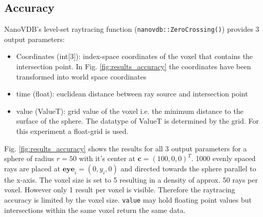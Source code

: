 \newpage
\subsection{Accuracy}

NanoVDB's level-set raytracing function (\texttt{nanovdb::ZeroCrossing()}) provides 3 output parameters:

\begin{itemize}
  \item Coordinates (int[3]): index-space coordinates of the voxel that contains the intersection point.
        In Fig. \ref{fig:results_accuracy} the coordinates have been transformed into world space coordinates
  \item time (float): euclidean distance between ray source and intersection point
  \item value (ValueT): grid value of the voxel i.e. the minimum distance to the surface of the sphere.
        The datatype of ValueT is determined by the grid. For this experiment a float-grid is used.
\end{itemize}

Fig. \ref{fig:results_accuracy} shows the results for all 3 output parameters for a sphere of radius $r=50$ with it's center at $\mathbf{c} = (100,0,0)^T$.
1000 evenly spaced rays are placed at $\mathbf{eye}_i = (0, y_i, 0)$ and directed towards the sphere parallel to the x-axis.
The voxel size is set to 5 resulting in a density of approx. 50 rays per voxel.
However only 1 result per voxel is visible.
Therefore the raytracing accuracy is limited by the voxel size.
\texttt{value} may hold floating point values but intersections within the same voxel return the same data.

